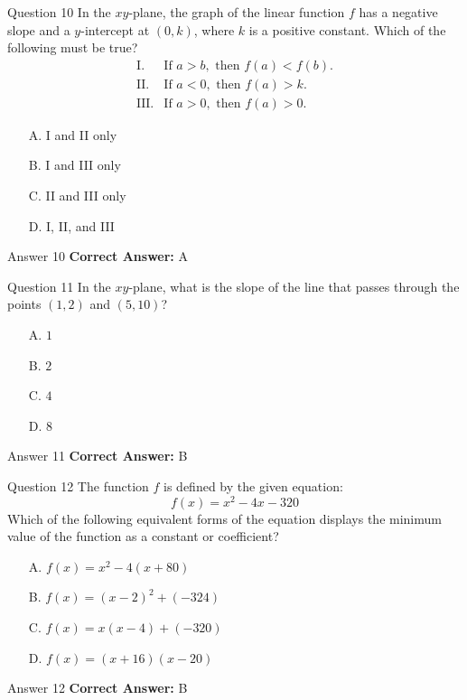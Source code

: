 \documentclass{beamer}
\begin{document}
\begin{frame}{Question 10}
\small
In the \(xy\)-plane, the graph of the linear function \(f\) has a negative slope
and a \(y\)-intercept at \((0,k)\), where \(k\) is a positive constant. Which of
the following must be true?
\[
\begin{array}{ll}
\text{I.} & \text{If }a>b,\text{ then }f(a)<f(b).\\
\text{II.} & \text{If }a<0,\text{ then }f(a)>k.\\
\text{III.} & \text{If }a>0,\text{ then }f(a)>0.
\end{array}
\]
\vspace{0.35cm}
\begin{enumerate}
    \item[A.] I and II only
    \item[B.] I and III only
    \item[C.] II and III only
    \item[D.] I, II, and III
\end{enumerate}
\end{frame}
\begin{frame}{Answer 10}
\small
\textbf{Correct Answer:} A
\end{frame}

\begin{frame}{Question 11}
\small
In the \(xy\)-plane, what is the slope of the line that passes through the points \((1,2)\) and \((5,10)\)?
\vspace{0.35cm}
\begin{enumerate}
    \item[A.] $1$
    \item[B.] $2$
    \item[C.] $4$
    \item[D.] $8$
\end{enumerate}
\end{frame}
\begin{frame}{Answer 11}
\small
\textbf{Correct Answer:} B
\end{frame}

\begin{frame}{Question 12}
\small
The function $f$ is defined by the given equation: 
\[
f(x) = x^2 - 4x - 320
\]
Which of the following equivalent forms of the equation displays the minimum value of the function as a constant or coefficient?
\vspace{0.35cm}
\begin{enumerate}
    \item[A.] $f(x) = x^2 - 4(x + 80)$
    \item[B.] $f(x) = (x - 2)^2 + (-324)$
    \item[C.] $f(x) = x(x - 4) + (-320)$
    \item[D.] $f(x) = (x + 16)(x - 20)$
\end{enumerate}
\end{frame}
\begin{frame}{Answer 12}
\small
\textbf{Correct Answer:} B
\end{frame}
\end{document}
